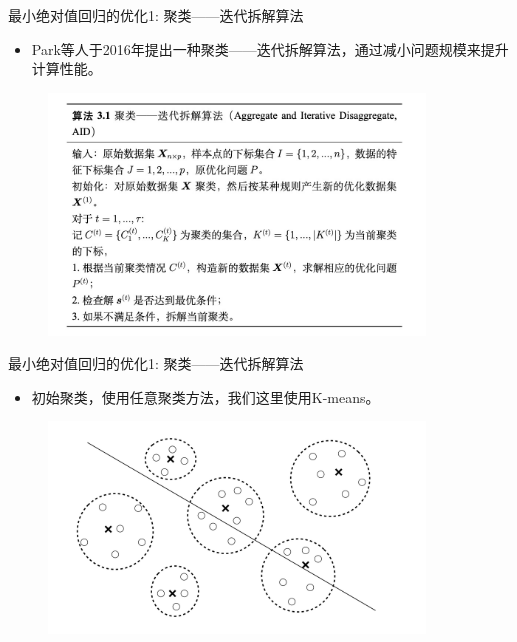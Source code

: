 \begin{frame}{最小绝对值回归的优化1: 聚类——迭代拆解算法}
    \begin{itemize}
        \item
        Park等人于2016年提出一种聚类——迭代拆解算法，通过减小问题规模来提升计算性能。
    \end{itemize}
    \begin{figure}[H]
        \includegraphics[width=10cm]{pics/aid-al.png}
    \end{figure}
\end{frame}
\begin{frame}{最小绝对值回归的优化1: 聚类——迭代拆解算法}
    \begin{itemize}
        \item 初始聚类，使用任意聚类方法，我们这里使用K-means。
    \end{itemize}
\begin{figure}[H]
\includegraphics[width=10cm]{pics/aid-demo-a.pdf}
\end{figure}
\end{frame}

